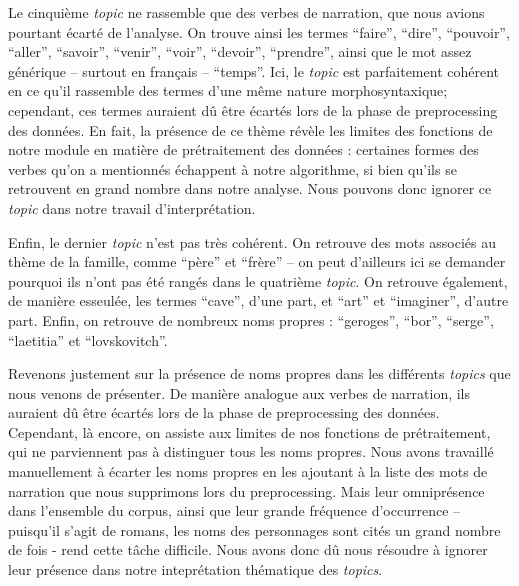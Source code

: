 \documentclass[letterpaper,portrait,12pt]{article}
\begin{document}
	Le cinqui\`{e}me \emph{topic} ne rassemble que des verbes de narration, que nous avions pourtant \'{e}cart\'{e} de l'analyse. On trouve ainsi les termes {``}faire'', {``}dire'', {``}pouvoir'', {``}aller'', {``}savoir'', {``}venir'', {``}voir'', {``}devoir'', {``}prendre'', ainsi que le mot assez g\'{e}n\'{e}rique -- surtout en fran\c{c}ais -- {``}temps''. Ici, le \emph{topic} est parfaitement coh\'{e}rent en ce qu'il rassemble des termes d'une m\^{e}me nature morphosyntaxique; cependant, ces termes auraient d\^{u} \^{e}tre \'{e}cart\'{e}s lors de la phase de preprocessing des donn\'{e}es. En fait, la pr\'{e}sence de ce th\`{e}me r\'{e}v\`{e}le les limites des fonctions de notre module en mati\`{e}re de pr\'{e}traitement des donn\'{e}es : certaines formes des verbes qu'on a mentionn\'{e}s \'{e}chappent \`{a} notre algorithme, si bien qu'ils se retrouvent en grand nombre dans notre analyse. Nous pouvons donc ignorer ce \emph{topic} dans notre travail d'interpr\'{e}tation. 





	Enfin, le dernier \emph{topic} n'est pas tr\`{e}s coh\'{e}rent. On retrouve des mots associ\'{e}s au th\`{e}me de la famille, comme {``}p\`{e}re'' et {``}fr\`{e}re'' -- on peut d'ailleurs ici se demander pourquoi ils n'ont pas \'{e}t\'{e} rang\'{e}s dans le quatri\`{e}me \emph{topic}. On retrouve \'{e}galement, de mani\`{e}re esseul\'{e}e, les termes {``}cave'', d'une part, et {``}art'' et {``}imaginer'', d'autre part. Enfin, on retrouve de nombreux noms propres : {``}geroges'', {``}bor'', {``}serge'', {``}laetitia'' et {``}lovskovitch''.





\textcolor[rgb]{0.000,0.000,0.000}{	Revenons justement sur la pr\'{e}sence de noms propres dans les diff\'{e}rents }\emph{\textcolor[rgb]{0.000,0.000,0.000}{topics}}\textcolor[rgb]{0.000,0.000,0.000}{ que nous venons de pr\'{e}senter. De mani\`{e}re analogue aux verbes de narration, ils auraient d\^{u} \^{e}tre \'{e}cart\'{e}s lors de la phase de preprocessing des donn\'{e}es. Cependant, l\`{a} encore, on assiste aux limites de nos fonctions de pr\'{e}traitement, qui ne parviennent pas \`{a} distinguer tous les noms propres. Nous avons travaill\'{e} manuellement \`{a} \'{e}carter les noms propres en les ajoutant \`{a} la liste des mots de narration que nous supprimons lors du preprocessing. Mais leur omnipr\'{e}sence dans l'ensemble du corpus, ainsi que leur grande fr\'{e}quence d'occurrence -- puisqu'il s'agit de romans, les noms des personnages sont cit\'{e}s un grand nombre de fois - rend cette t\^{a}che difficile. Nous avons donc d\^{u} nous r\'{e}soudre \`{a} ignorer leur pr\'{e}sence dans notre intepr\'{e}tation th\'{e}matique des }\emph{\textcolor[rgb]{0.000,0.000,0.000}{topics}}\textcolor[rgb]{0.000,0.000,0.000}{.}
\end{document}
